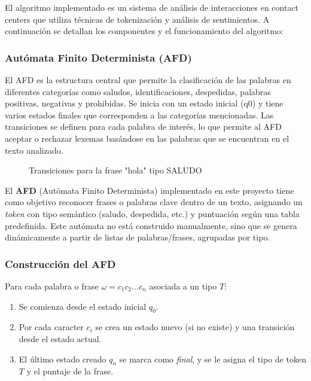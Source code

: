 El algoritmo implementado es un sistema de análisis de interacciones en contact centers que
utiliza técnicas de tokenización y análisis de sentimientos. A continuación se detallan los
componentes y el funcionamiento del algoritmo:

\subsubsection{Autómata Finito Determinista (AFD)}
El AFD es la estructura central que permite la clasificación de las palabras en diferentes
categorías como saludos, identificaciones, despedidas, palabras positivas, negativas y
prohibidas. Se inicia con un estado inicial (q0) y tiene varios estados finales que
corresponden a las categorías mencionadas. Las transiciones se definen para cada palabra de
interés, lo que permite al AFD aceptar o rechazar lexemas basándose en las palabras que se
encuentran en el texto analizado.

\begin{figure}[h]
    \centering
    \caption{Transiciones para la frase "hola" tipo SALUDO}
\end{figure}


El \textbf{AFD} (Autómata Finito Determinista) implementado en este proyecto tiene como
objetivo reconocer frases o palabras clave dentro de un texto, asignando un \textit{token} con
tipo semántico (saludo, despedida, etc.) y puntuación según una tabla predefinida. Este
autómata no está construido manualmente, sino que se genera dinámicamente a partir de listas de
palabras/frases, agrupadas por tipo.

\subsubsection{Construcción del AFD}

Para cada palabra o frase $\omega = c_1 c_2 \ldots c_n$ asociada a un tipo $T$:
\begin{enumerate}
	\item Se comienza desde el estado inicial $q_0$.
	\item Por cada caracter $c_i$ se crea un estado nuevo (si no existe) y una transición desde el estado actual.
	\item El último estado creado $q_n$ se marca como \textit{final}, y se le asigna el tipo de token $T$ y el puntaje de la frase.
\end{enumerate}

